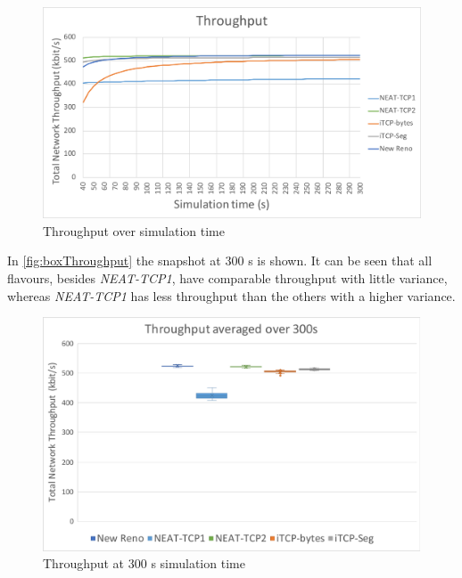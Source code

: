 \begin{figure}[h]
	\centering
	\includegraphics[width=1\textwidth]{plotThroughput}
	\caption{Throughput over simulation time}
	\label{fig:plotThroughput}
\end{figure}
In \autoref{fig:boxThroughput} the snapshot at 300 s is shown. It can be seen that all flavours, besides \textit{NEAT-TCP1}, have comparable throughput with little variance, whereas \textit{NEAT-TCP1} has less throughput than the others with a higher variance. 
\begin{figure}[!h]
	\centering
	\includegraphics[width=1\textwidth]{boxThroughput}
	\caption{Throughput at 300 s simulation time}
	\label{fig:boxThroughput}
\end{figure}

